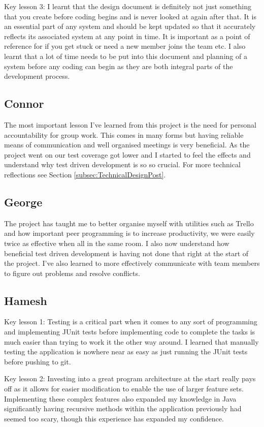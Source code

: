 Key lesson 3:
I learnt that the design document is definitely not just something that you create before coding begins and is never looked at again after that. It is an essential part of any system and should be kept updated so that it accurately reflects its associated system  at any point in time. It is important as a point of reference for if you get stuck or need a new member joins the team etc. I also learnt that a lot of time needs to be put into this document and planning of a system before any coding can begin as they are both integral parts of the development process.


\subsection{Connor}
The most important lesson I've learned from this project is the need for personal accountability for group work. This comes in many forms but having reliable means of communication and well organised meetings is very beneficial. As the project went on our test coverage got lower and I started to feel the effects and understand why test driven development is so so crucial. For more technical reflections see Section \ref{subsec:TechnicalDesignPost}.

\subsection{George}
The project has taught me to better organise myself with utilities such as Trello and how important peer programming is to increase productivity, we were easily twice as effective when all in the same room. I also now understand how beneficial test driven development is having not done that right at the start of the project. I've also learned to more effectively communicate with team members to figure out problems and resolve conflicts.

\subsection{Hamesh}
Key lesson 1:
Testing is a critical part when it comes to any sort of programming and implementing JUnit tests before implementing code to complete the tasks is much easier than trying to work it the other way around. I learned that manually testing the application is nowhere near as easy as just running the JUnit tests before pushing to git.

Key lesson 2:
Investing into a great program architecture at the start really pays off as it allows for easier modification to enable the use of larger feature sets. Implementing these complex features also expanded my knowledge in Java significantly having recursive methods within the application previously had seemed too scary, though this experience has expanded my confidence.

